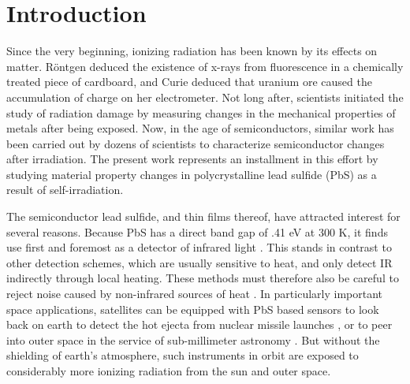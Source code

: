 \chapter{Introduction}
Since the very beginning, ionizing radiation has been known by its effects on matter. R\"{o}ntgen deduced the existence of x-rays from fluorescence in a chemically treated piece of cardboard, and Curie deduced that uranium ore caused the accumulation of charge on her electrometer. Not long after, scientists initiated the study of radiation damage by measuring changes in the mechanical properties of metals after being exposed. Now, in the age of semiconductors, similar work has been carried out by dozens of scientists to characterize semiconductor changes after irradiation. The present work represents an installment in this effort by studying material property changes in polycrystalline lead sulfide (PbS) as a result of self-irradiation.

The semiconductor lead sulfide, and thin films thereof, have attracted interest for several reasons. Because PbS has a direct band gap of .41 eV at 300 K, it finds use first and foremost as a detector of infrared light \cite{Machol1993, Machol1994}. This stands in contrast to other detection schemes, which are usually sensitive to heat, and only detect IR indirectly through local heating. These methods must therefore also be careful to reject noise caused by non-infrared sources of heat \cite{Rogalski2012}. In particularly important space applications, satellites can be equipped with PbS based sensors to look back on earth to detect the hot ejecta from nuclear missile launches \cite{Rogalski2012}, or to peer into outer space in the service of sub-millimeter astronomy \cite{Baddiley1977}. But without the shielding of earth's atmosphere, such instruments in orbit are exposed to considerably more ionizing radiation from the sun and outer space.


